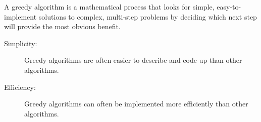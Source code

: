 A greedy algorithm is a mathematical process that looks for simple, 
	easy-to-implement solutions to complex, multi-step problems by deciding 
	which next step will provide the most obvious benefit.



\begin{description}
\item[Simplicity:]  Greedy algorithms are often
easier to describe and code up than other algorithms.
\item[Efficiency:] Greedy algorithms can often be
implemented more efficiently than other algorithms.
    

\end{description}

